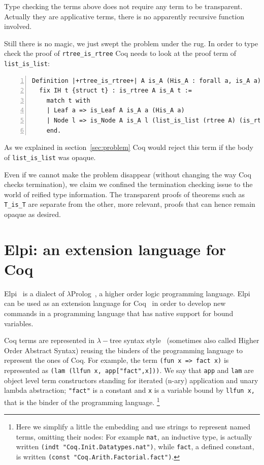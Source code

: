 \documentclass[a4paper,UKenglish,cleveref, autoref]{lipics-v2019}
\begin{document}
Type checking the terms above does not require any term to be
transparent. Actually they are applicative terms, there is no
apparently recursive function involved.

Still there is no magic, we just swept the problem under the rug.
In order to type check the proof
of \lstinline+rtree_is_rtree+ Coq needs to look at the
proof term of \lstinline+list_is_list+:
\begin{lstlisting}[numbers=left]
Definition |+rtree_is_rtree+| A is_A (His_A : forall a, is_A a) :=
  fix IH t {struct t} : is_rtree A is_A t :=
    match t with
    | Leaf a => is_Leaf A is_A a (His_A a)
    | Node l => is_Node A is_A l (list_is_list (rtree A) (is_rtree A) IH l)
    end.
\end{lstlisting}

\noindent
As we explained in section~\ref{sec:problem} Coq would reject this term
if the
body of  \lstinline+list_is_list+ was opaque.

Even if we cannot make the problem disappear (without changing the way Coq
checks termination), we claim we confined the termination checking issue
to the world of reified type information. The transparent proofs of
theorems such as \lstinline+T_is_T+ are separate from the other, more
relevant, proofs that can hence remain opaque as desired.

\section{Elpi: an extension language for Coq} %
\label{sec:elpilang}

Elpi~\cite{dunchev:hal-01176856} is a dialect of
$\lambda$Prolog~\cite{miller_nadathur_2012}, a higher order logic
programming language. Elpi can be used as an extension language for
Coq~\cite{tassi:hal-01637063} in order to develop new commands in a programming
language that has native support for bound variables.

Coq terms are represented in $\lambda-$tree syntax
style~\cite{10.1007/3-540-44957-4_16} (sometimes also called
Higher Order Abstract Syntax) reusing the binders of the programming
language to represent the ones of Coq.
For example, the
term \lstinline+(fun x => fact x)+ is represented as
\lstinline+(lam (llfun x, app["fact",x]))+. 
We say that \lstinline+app+ and \lstinline+lam+ are object level term
constructors standing for iterated (n-ary) application and unary lambda
abstraction; \lstinline+"fact"+ is a constant and \lstinline+x+ is a
variable bound by \lstinline+llfun x,+ that is the binder
of the programming language.  \footnote{Here we simplify
a little the embedding and use strings to represent named terms,
omitting their nodes:
For example \lstinline+nat+,
an inductive type,
is actually written \lstinline+(indt "Coq.Init.Datatypes.nat")+,
while \lstinline+fact+, a defined constant,
is written \lstinline+(const "Coq.Arith.Factorial.fact")+.}
\end{document}
